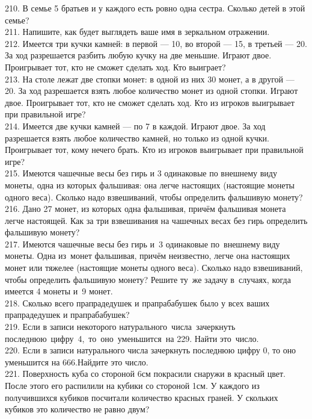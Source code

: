 210. В семье 5 братьев и у каждого есть ровно одна сестра. Сколько детей в этой семье?\\
211. Напишите, как будет выглядеть ваше имя в зеркальном отражении.\\
212. Имеется три кучки камней: в первой --- 10, во второй --- 15, в третьей --- 20. За ход разрешается разбить любую кучку на две меньшие. Играют двое. Проигрывает тот, кто не сможет сделать ход. Кто выиграет?\\
213. На столе лежат две стопки монет: в одной из них 30 монет, а в другой --- 20. За ход разрешается взять любое количество монет из одной стопки. Играют двое. Проигрывает тот, кто не сможет сделать ход. Кто из игроков выигрывает при правильной игре?\\
214. Имеется две кучки камней --- по 7 в каждой. Играют двое. За ход разрешается взять любое количество камней, но только из одной кучки. Проигрывает тот, кому нечего брать. Кто из игроков выигрывает при правильной игре?\\
215. Имеются чашечные весы без гирь и 3 одинаковые по внешнему виду монеты, одна из которых фальшивая: она легче настоящих (настоящие монеты одного веса). Сколько надо взвешиваний, чтобы определить фальшивую монету?\\
216. Дано 27 монет, из которых одна фальшивая, причём фальшивая монета легче настоящей. Как за три взвешивания на чашечных весах без гирь определить фальшивую монету?\\
217. Имеются чашечные весы без гирь и 3 одинаковые по внешнему виду монеты. Одна из монет фальшивая, причём неизвестно, легче она настоящих монет или тяжелее (настоящие монеты одного веса). Сколько надо взвешиваний, чтобы определить фальшивую монету? Решите ту же задачу в случаях, когда имеется 4 монеты и 9 монет.\\
218. Сколько всего прапрадедушек и прапрабабушек было у всех ваших прапрадедушек и прапрабабушек?\\
219. Если в записи некоторого натурального числа зачеркнуть последнюю цифру 4, то оно уменьшится на 229. Найти это число.\\
220. Если в записи натурального числа зачеркнуть последнюю цифру 0, то оно уменьшится на 666.Найдите это число.\\
221. Поверхность куба со стороной 6см покрасили снаружи в красный цвет. После этого его распилили на кубики со стороной 1см. У каждого из получившихся кубиков посчитали количество красных граней. У скольких кубиков это количество не равно двум?\\
